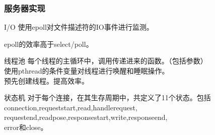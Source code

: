 \documentclass[10pt,dvipdfm]{beamer}
\begin{document}
\begin{frame}
	\frametitle{服务器实现}
	\begin{block}{I/O}
	使用epoll对文件描述符的IO事件进行监测。
	
	epoll的效率高于select/poll。
	\end{block}
	
	\pause
	\begin{block}{线程池}
		每个线程的主循环中，调用传递进来的函数。（包括参数）\\
		使用pthread的条件变量对线程进行唤醒和睡眠操作。\\
		预先创建线程。提高效率。
	\end{block}
	
	\pause
	\begin{block}{状态机}
	对于每个连接，在其生存周期中，共定义了11个状态。包括connection,requeststart,read,handlerequest, \\requestend,readpose,responsestart,write,responseend,\\error和close。
	\end{block}
\end{frame}
\end{document}
